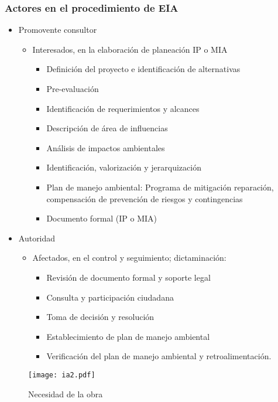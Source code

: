 \subsubsection{Actores en el procedimiento de EIA}
\begin{itemize}
    \item Promovente consultor \begin{itemize}
        \item Interesados, en la elaboración de planeación IP o MIA \begin{itemize}
            \item Definición del proyecto e identificación de alternativas
            \item Pre-evaluación
            \item Identificación de requerimientos y alcances
            \item Descripción de área de influencias
            \item Análisis de impactos ambientales
            \item Identificación, valorización y jerarquización
            \item Plan de manejo ambiental: Programa de mitigación reparación, compensación de prevención de riesgos y contingencias
            \item Documento formal (IP o MIA)
        \end{itemize}
    \end{itemize}
    \item Autoridad \begin{itemize}
        \item Afectados, en el control y seguimiento; dictaminación: \begin{itemize}
            \item Revisión de documento formal y soporte legal
            \item Consulta y participación ciudadana
            \item Toma de decisión y resolución
            \item Establecimiento de plan de manejo ambiental
            \item Verificación del plan de manejo ambiental y retroalimentación.
        \end{itemize}
    \end{itemize}
\end{itemize}
\begin{figure}[h!]
\centering
  \texttt{[image: ia2.pdf]}
  \caption{Necesidad de la obra}
  \label{ia2}
\end{figure}
